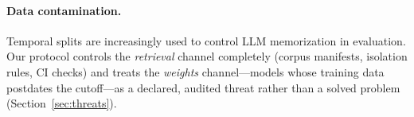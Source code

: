 \paragraph{Data contamination.}
Temporal splits are increasingly used to control LLM memorization in
evaluation. Our protocol controls the \emph{retrieval} channel
completely (corpus manifests, isolation rules, CI checks) and treats the
\emph{weights} channel---models whose training data postdates the
cutoff---as a declared, audited threat rather than a solved problem
(Section~\ref{sec:threats}).
